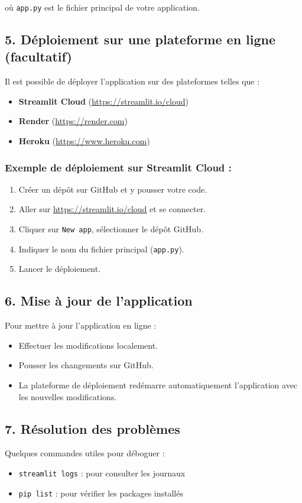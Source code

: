 où \texttt{app.py} est le fichier principal de votre application.

\subsection{5. Déploiement sur une plateforme en ligne (facultatif)}

Il est possible de déployer l'application sur des plateformes telles que :

\begin{itemize}
  \item \textbf{Streamlit Cloud} (\url{https://streamlit.io/cloud})
  \item \textbf{Render} (\url{https://render.com})
  \item \textbf{Heroku} (\url{https://www.heroku.com})
\end{itemize}

\subsubsection*{Exemple de déploiement sur Streamlit Cloud :}

\begin{enumerate}
  \item Créer un dépôt sur GitHub et y pousser votre code.
  \item Aller sur \url{https://streamlit.io/cloud} et se connecter.
  \item Cliquer sur \texttt{New app}, sélectionner le dépôt GitHub.
  \item Indiquer le nom du fichier principal (\texttt{app.py}).
  \item Lancer le déploiement.
\end{enumerate}

\subsection{6. Mise à jour de l'application}

Pour mettre à jour l’application en ligne :

\begin{itemize}
  \item Effectuer les modifications localement.
  \item Pousser les changements sur GitHub.
  \item La plateforme de déploiement redémarre automatiquement l’application avec les nouvelles modifications.
\end{itemize}

\subsection{7. Résolution des problèmes}

Quelques commandes utiles pour déboguer :

\begin{itemize}
  \item \texttt{streamlit logs} : pour consulter les journaux
  \item \texttt{pip list} : pour vérifier les packages installés
\end{itemize}

